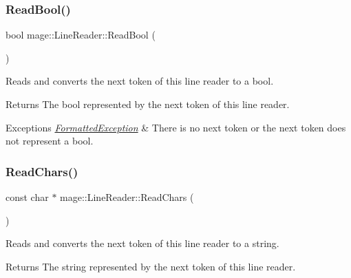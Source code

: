 \hypertarget{classmage_1_1_line_reader_a86289c358afe9b3bc5c7789bb8a6af95}{}\label{classmage_1_1_line_reader_a86289c358afe9b3bc5c7789bb8a6af95} 
\subsubsection{\texorpdfstring{Read\+Bool()}{ReadBool()}}
{\footnotesize\ttfamily bool mage\+::\+Line\+Reader\+::\+Read\+Bool (\begin{DoxyParamCaption}{ }\end{DoxyParamCaption})\hspace{0.3cm}{\ttfamily [protected]}}

Reads and converts the next token of this line reader to a {\ttfamily bool}.

\begin{DoxyReturn}{Returns}
The {\ttfamily bool} represented by the next token of this line reader. 
\end{DoxyReturn}

\begin{DoxyExceptions}{Exceptions}
{\em \hyperlink{structmage_1_1_formatted_exception}{Formatted\+Exception}} & There is no next token or the next token does not represent a {\ttfamily bool}. \\
\hline
\end{DoxyExceptions}
\hypertarget{classmage_1_1_line_reader_ad915c1a17549c7758c10f0b6db7e5611}{}\label{classmage_1_1_line_reader_ad915c1a17549c7758c10f0b6db7e5611} 
\subsubsection{\texorpdfstring{Read\+Chars()}{ReadChars()}}
{\footnotesize\ttfamily const char $\ast$ mage\+::\+Line\+Reader\+::\+Read\+Chars (\begin{DoxyParamCaption}{ }\end{DoxyParamCaption})\hspace{0.3cm}{\ttfamily [protected]}}

Reads and converts the next token of this line reader to a string.

\begin{DoxyReturn}{Returns}
The string represented by the next token of this line reader. 
\end{DoxyReturn}

